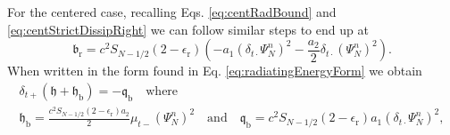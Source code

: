 \documentclass[dvipsnames]{article}
\def\SWcomment[#1]{\textcolor{blue}{#1}}
\def\dxp{\delta_{x+}}
\def\dxm{\delta_{x-}}
\def\dtd{\delta_{t\cdot}}
\begin{document}
For the centered case, recalling Eqs. \eqref{eq:centRadBound} and \eqref{eq:centStrictDissipRight} we can follow similar steps to end up at
\begin{equation}
    \mathfrak{b}_\text{r} = c^2S_{N-1/2}(2-\epsilon_\text{r})(-a_1(\dtd\Psi_N^n)^2-\frac{a_2}{2}\dtd(\Psi_N^n)^2).
\end{equation}
When written in the form found in Eq. \eqref{eq:radiatingEnergyForm} we obtain
\begin{equation}
    \begin{gathered}
    \delta_{t+}\left(\mathfrak{h} + \mathfrak{h}_\text{b}\right) = -\mathfrak{q}_\text{b} \quad \text{where}\\
    \mathfrak{h}_\text{b} = \frac{c^2S_{N-1/2}(2-\epsilon_\text{r})a_2}{2}\mu_{t-} (\Psi_N^n)^2 \quad \text{and} \quad
    \mathfrak{q}_\text{b} = c^2S_{N-1/2}(2-\epsilon_\text{r})a_1(\dtd\Psi_N^n)^2,
    \end{gathered}
\end{equation}
\end{document}
